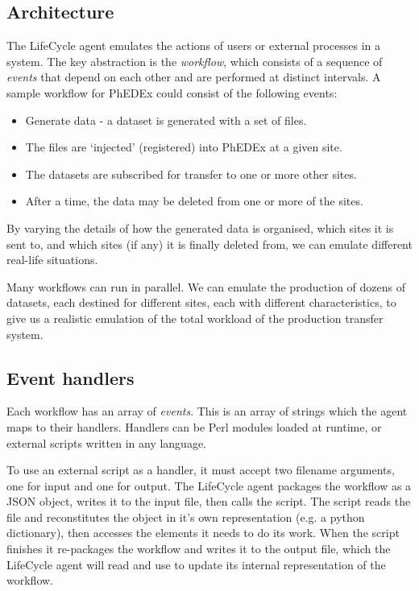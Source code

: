\subsection{Architecture}
The LifeCycle agent emulates the actions of users or external processes in 
a system. The key abstraction is the {\it workflow}, which consists of a sequence of {\it events} 
that depend on each other and are performed at distinct intervals. A sample workflow for PhEDEx could consist of the following events:

\begin{itemize}
  \item Generate data - a dataset is generated with a set of files.
  \item The files are `injected' (registered) into PhEDEx at a given site.
  \item The datasets are subscribed for transfer to one or more other sites.
  \item After a time, the data may be deleted from one or more of the sites.
\end{itemize}

By varying the details of how the generated data is organised, which sites it is sent to, and 
which sites (if any) it is finally deleted from, we can emulate different real-life situations.

Many workflows can run in parallel. We can emulate the production of dozens of 
datasets, each destined for different sites, each with different characteristics, to give us a 
realistic emulation of the total workload of the production transfer system.

\subsection{Event handlers}
Each workflow has an array of {\it events}. This is an array of strings which the agent maps to their handlers. Handlers can be Perl modules loaded at runtime, or external scripts written in any language.

To use an external script as a handler, it must accept two filename arguments, one for input and one for output. The LifeCycle agent packages the workflow as a JSON object, writes it to the input file, then calls the script. The script reads the file and reconstitutes the object in it's own representation (e.g. a python dictionary), then accesses the elements it needs to do its work. When the script finishes it re-packages the workflow and writes it to the output file, which the LifeCycle agent will read and use to update its internal representation of the workflow.


